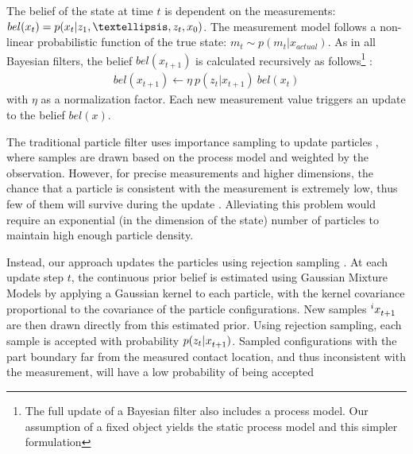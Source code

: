 \documentclass[letterpaper, 10 pt, conference]{ieeeconf}
\newcommand{\state}{x}
\newcommand{\measurement}{m}
\begin{document}
The belief of the state at time $t$ is dependent on the measurements: $bel(x_t) = p(x_t| z_1, \textellipsis, z_t, x_0)$. The measurement model follows a non-linear probabilistic function of the true state: $\measurement_t \sim p(\measurement_t|\state_{actual})$. 
As in all Bayesian filters, the belief $bel(x_{t+1})$ is calculated recursively as follows\footnote{The full update of a Bayesian filter also includes a process model. Our assumption of a fixed object yields the static process model and this simpler formulation} \cite{Thrun2000}:
\begin{align}
bel(x_{t+1}) \leftarrow \eta \ p(z_t|x_{t+1}) \  bel(x_t)
\end{align}
with $\eta$ as a normalization factor. Each new measurement value triggers an update to the belief $bel(x)$. 

The traditional particle filter uses importance sampling to update particles \cite{Thrun2000}, where samples are drawn based on the process model and weighted by the observation. However, for precise measurements and higher dimensions, the chance that a particle is consistent with the measurement is extremely low, thus few of them will survive during the update \cite{Koval2013}. 
Alleviating this problem would require an exponential (in the dimension of the state) number of particles to maintain high enough particle density.

Instead, our approach updates the particles using rejection sampling \cite{Saund2017}. At each update step $t$, the continuous prior belief is estimated using Gaussian Mixture Models by applying a Gaussian kernel to each particle, with the kernel covariance proportional to the covariance of the particle configurations. 
New samples $\particle[t+1][i]$ are then drawn directly from this estimated prior. 
Using rejection sampling, each sample is accepted with probability $p(z_t|\particle[t+1])$. 
Sampled configurations with the part boundary far from the measured contact location, and thus inconsistent with the measurement, will have a low probability of being accepted
\end{document}
